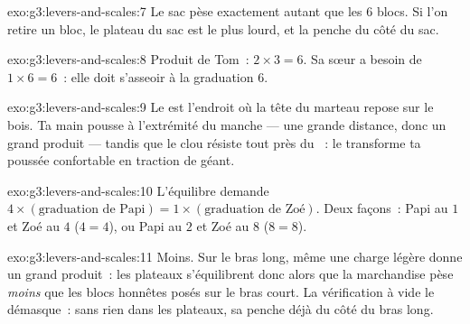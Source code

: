 \begin{solution}{exo:g3:levers-and-scales:7}
Le sac pèse exactement autant que les $6$ blocs. Si l'on retire un
bloc, le plateau du sac est le plus lourd, et la  penche du
côté du sac.
\end{solution}

\begin{solution}{exo:g3:levers-and-scales:8}
Produit de Tom~: $2 \times 3 = 6$. Sa sœur a besoin de
$1 \times 6 = 6$~: elle doit s'asseoir à la graduation $6$.
\end{solution}

\begin{solution}{exo:g3:levers-and-scales:9}
Le  est l'endroit où la tête du marteau repose sur le bois. Ta
main pousse à l'extrémité du manche --- une grande distance, donc un
grand produit --- tandis que le clou résiste tout près du ~: le
 transforme ta poussée confortable en traction de géant.
\end{solution}

\begin{solution}{exo:g3:levers-and-scales:10}
L'équilibre demande $4 \times (\text{graduation de Papi}) = 1 \times
(\text{graduation de Zoé})$. Deux façons~: Papi au $1$ et Zoé au $4$
($4 = 4$), ou Papi au $2$ et Zoé au $8$ ($8 = 8$).
\end{solution}

\begin{solution}{exo:g3:levers-and-scales:11}
Moins. Sur le bras long, même une charge légère donne un grand
produit~: les plateaux s'équilibrent donc alors que la marchandise
pèse \emph{moins} que les blocs honnêtes posés sur le bras court. La
vérification à vide le démasque~: sans rien dans les plateaux, sa
 penche déjà du côté du bras long.
\end{solution}
